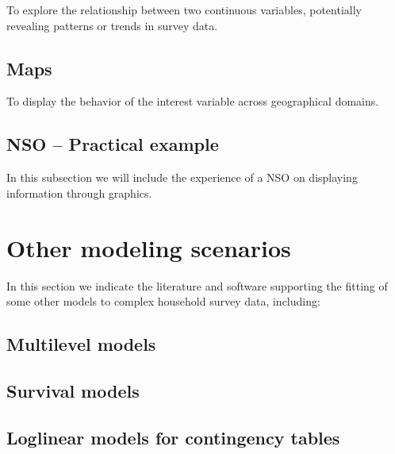 \documentclass[
  12pt,
]{book}
\begin{document}
To explore the relationship between two continuous variables, potentially revealing patterns or trends in survey data.

\hypertarget{maps}{%
\section{Maps}\label{maps}}

To display the behavior of the interest variable across geographical domains.

\hypertarget{nso-practical-example-3}{%
\section{NSO -- Practical example}\label{nso-practical-example-3}}

In this subsection we will include the experience of a NSO on displaying information through graphics.

\hypertarget{other-modeling-scenarios}{%
\chapter{Other modeling scenarios}\label{other-modeling-scenarios}}

In this section we indicate the literature and software supporting the fitting of some other models to complex household survey data, including:

\hypertarget{multilevel-models}{%
\section{Multilevel models}\label{multilevel-models}}

\hypertarget{survival-models}{%
\section{Survival models}\label{survival-models}}

\hypertarget{loglinear-models-for-contingency-tables}{%
\section{Loglinear models for contingency tables}\label{loglinear-models-for-contingency-tables}}
\end{document}
